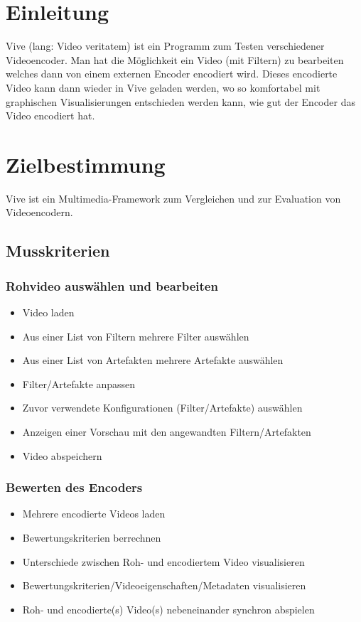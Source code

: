 \documentclass[parskip=full]{scrartcl}
\author {Carina Weber, Jan Benedikt Schwarz, Johannes Werner, Noel Schuhmacher,\\
Sascha Rapp, Simon Grafenhorst}
\begin{document}
\maketitle
\thispagestyle{empty}
\newpage
\tableofcontents
\newpage
\section*{Einleitung}
Vive (lang: Video veritatem) ist ein Programm zum Testen verschiedener Videoencoder. Man hat die Möglichkeit ein Video (mit Filtern) zu bearbeiten welches dann von einem externen Encoder encodiert wird. Dieses encodierte Video kann dann wieder in Vive geladen werden, wo so komfortabel mit graphischen Visualisierungen entschieden werden kann, wie gut der Encoder das Video encodiert hat.
\newpage
\section{Zielbestimmung}
Vive ist ein Multimedia-Framework zum Vergleichen und zur Evaluation von Videoencodern.
\subsection{Musskriterien}
\subsubsection{Rohvideo auswählen und bearbeiten}
\begin{itemize}
\item Video laden
\item Aus einer List von Filtern mehrere Filter auswählen
\item Aus einer List von Artefakten mehrere Artefakte auswählen
\item Filter/Artefakte anpassen
\item Zuvor verwendete Konfigurationen (Filter/Artefakte) auswählen
\item Anzeigen einer Vorschau mit den angewandten Filtern/Artefakten
\item Video abspeichern
\end{itemize}
\subsubsection{Bewerten des Encoders}
\begin{itemize}
\item Mehrere encodierte Videos laden
\item Bewertungskriterien berrechnen
\item Unterschiede zwischen Roh- und encodiertem Video visualisieren
\item Bewertungskriterien/Videoeigenschaften/Metadaten visualisieren
\item Roh- und encodierte(s) Video(s) nebeneinander synchron abspielen
\end{itemize}
\newpage
\end{document}
